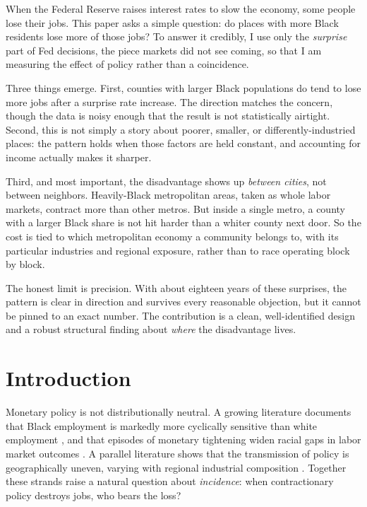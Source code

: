\documentclass[11pt]{article}
\begin{document}
\begin{summarybox}
When the Federal Reserve raises interest rates to slow the economy, some people lose their
jobs. This paper asks a simple question: do places with more Black residents lose more of
those jobs? To answer it credibly, I use only the \emph{surprise} part of Fed decisions,
the piece markets did not see coming, so that I am measuring the effect of policy rather
than a coincidence.

Three things emerge. First, counties with larger Black populations do tend to lose more
jobs after a surprise rate increase. The direction matches the concern, though the data is
noisy enough that the result is not statistically airtight. Second, this is not simply a
story about poorer, smaller, or differently-industried places: the pattern holds when those
factors are held constant, and accounting for income actually makes it sharper.

Third, and most important, the disadvantage shows up \emph{between cities}, not between
neighbors. Heavily-Black metropolitan areas, taken as whole labor markets, contract more
than other metros. But inside a single metro, a county with a larger Black share is not hit
harder than a whiter county next door. So the cost is tied to which metropolitan economy a
community belongs to, with its particular industries and regional exposure, rather than to
race operating block by block.

The honest limit is precision. With about eighteen years of these surprises, the pattern is
clear in direction and survives every reasonable objection, but it cannot be pinned to an
exact number. The contribution is a clean, well-identified design and a robust structural
finding about \emph{where} the disadvantage lives.
\end{summarybox}

\section{Introduction}
Monetary policy is not distributionally neutral. A growing literature documents that Black
employment is markedly more cyclically sensitive than white employment
\citep{CajnerEtAl2017}, and that episodes of monetary tightening widen racial gaps in labor
market outcomes \citep{CarpenterRodgers2004, SeguinoHeintz2012}. A parallel literature shows
that the transmission of policy is geographically uneven, varying with regional industrial
composition \citep{CarlinoDeFina1998}. Together these strands raise a natural question about
\emph{incidence}: when contractionary policy destroys jobs, who bears the loss?
\end{document}
